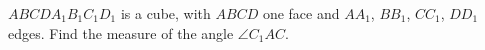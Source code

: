 $ABCDA_1B_1C_1D_1$ is a cube, with $ABCD$ one face and $AA_1$, $BB_1$, $CC_1$, $DD_1$ edges. Find the measure of the angle $\angle C_1AC$.
